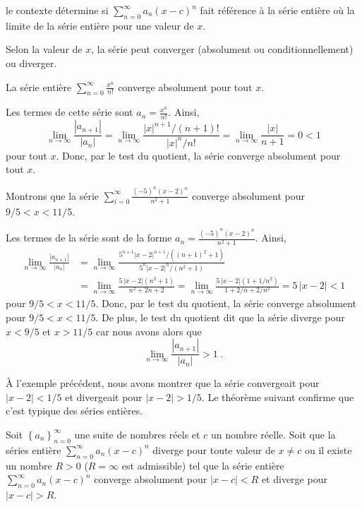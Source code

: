 {\begin{defn}
le contexte détermine si $\displaystyle \sum_{n=0}^\infty a_n (x-c)^n$ fait
référence à la série entière où la limite de la série entière pour une valeur
de $x$.
\end{defn}

Selon la valeur de $x$, la série peut converger (absolument ou
conditionnellement) ou diverger.

\begin{egg}
La série entière $\displaystyle \sum_{n=0}^\infty \frac{x^n}{n!}$ converge
absolument pour tout $x$.

Les termes de cette série sont $\displaystyle a_n = \frac{x^n}{n!}$.
Ainsi,
\[
\lim_{n\rightarrow \infty} \frac{|a_{n+1}|}{|a_n|}
= \lim_{n\rightarrow \infty} \frac{|x|^{n+1}/(n+1)!}{|x|^n/n!}
= \lim_{n\rightarrow \infty} \frac{|x|}{n+1} = 0 < 1
\]
pour tout $x$.  Donc, par le test du quotient, la série converge absolument
pour tout $x$.
\label{exp_serie_egg}
\end{egg}

\begin{egg}
Montrons que la série
$\displaystyle \sum_{i=0}^\infty \frac{(-5)^n(x-2)^n}{n^2+1}$ converge
absolument pour $9/5 < x < 11/5$.

Les termes de la série sont de la forme
$\displaystyle a_n = \frac{(-5)^n(x-2)^n}{n^2+1}$.
Ainsi,
\begin{align*}
\lim_{n\rightarrow \infty} \frac{|a_{n+1}|}{|a_n|}
&= \lim_{n\rightarrow \infty} \frac{5^{n+1}|x-2|^{n+1}/((n+1)^2+1)}
{5^n|x-2|^n/(n^2+1)} \\
&= \lim_{n\rightarrow \infty} \frac{5\,|x-2|(n^2+1)}{n^2+2n+2}
= \lim_{n\rightarrow \infty} \frac{5\,|x-2|(1+1/n^2)}{1+2/n+2/n^2}
 = 5\,|x-2| < 1
\end{align*}
pour $9/5 < x < 11/5$.  Donc, par le test du quotient, la
série converge absolument pour $9/5 < x < 11/5$.
De plus, le test du quotient dit que la série diverge pour $x<9/5$ et
$x>11/5$ car nous avons alors que
\[
\lim_{n\rightarrow \infty} \frac{|a_{n+1}|}{|a_n|} > 1 \; .
\]
\label{entiere_egg}
\end{egg}

À l'exemple précédent, nous avons montrer que la série convergeait
pour $|x-2|<1/5$ et divergeait pour $|x-2|>1/5$.  Le théorème suivant
confirme que c'est typique des séries entières.

\begin{theorem}
Soit $\displaystyle \left\{a_n\right\}_{n=0}^\infty$ une suite de nombres
réels et $c$ un nombre réelle.  Soit que la séries entière
$\displaystyle \sum_{n=0}^\infty a_n (x-c)^n$ diverge pour toute valeur
de $x \neq c$ ou il existe un nombre $R>0$ ($R=\infty$ est admissible)
tel que la série entière $\displaystyle \sum_{n=0}^\infty a_n (x-c)^n$
converge absolument pour $|x-c|<R$ et diverge pour $|x-c|>R$.
\end{theorem}

}

